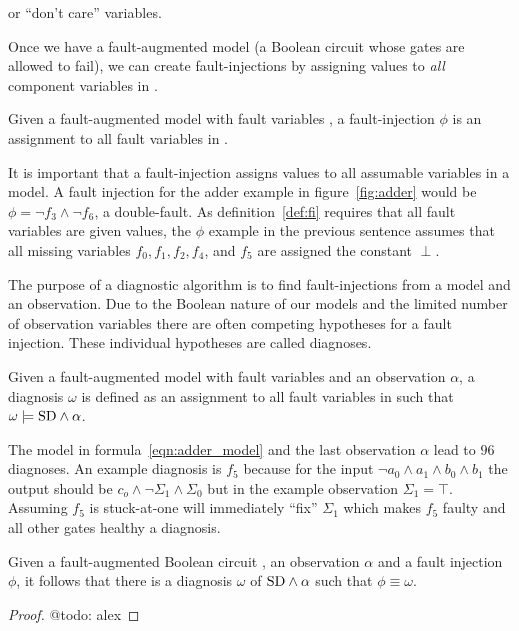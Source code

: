 \documentclass{article}
\begin{document}
or ``don't care'' variables.
\par
Once we have a fault-augmented model (a Boolean circuit whose gates
are allowed to fail), we can create fault-injections by assigning
values to \textit{all} component variables in \comps.
%
\begin{definition}\label{def:fi}
  Given a fault-augmented model \sd with fault variables \comps, a
  fault-injection $\phi$ is an assignment to all fault variables in
  \comps.
\end{definition}
%
It is important that a fault-injection assigns values to all assumable
variables in a model. A fault injection for the adder example in
figure~\ref{fig:adder} would be $\phi = \neg{f_3} \wedge \neg{f_6}$, a
double-fault. As definition~\ref{def:fi} requires that all fault
variables are given values, the $\phi$ example in the previous sentence
assumes that all missing variables $f_0, f_1, f_2, f_4$, and $f_5$ are
assigned the constant $\perp$.
\par
The purpose of a diagnostic algorithm is to find fault-injections from
a model and an observation. Due to the Boolean nature of our models
and the limited number of observation variables there are often
competing hypotheses for a fault injection. These individual
hypotheses are called diagnoses.
%
\begin{definition}[Diagnosis]
  Given a fault-augmented model \sd with fault variables \comps and an
  observation $\alpha$, a diagnosis $\omega$ is defined as an
  assignment to all fault variables in \comps such that $\omega
  \models \mathrm{SD} \wedge \alpha$.
\end{definition}
%
The model in formula~\ref{eqn:adder_model} and the last observation
$\alpha$ lead to $96$ diagnoses. An example diagnosis is $f_5$ because
for the input $\neg{a_0} \wedge a_1 \wedge b_0 \wedge b_1$ the output
should be $c_o \wedge \neg{\Sigma_1} \wedge \Sigma_0$ but in the
example observation $\Sigma_1 = \top$. Assuming $f_5$ is stuck-at-one
will immediately ``fix'' $\Sigma_1$ which makes $f_5$ faulty and all
other gates healthy a diagnosis.
%
\begin{proposition}
  Given a fault-augmented Boolean circuit \sd, an observation $\alpha$
  and a fault injection $\phi$, it follows that there is a diagnosis
  $\omega$ of $\mathrm{SD} \wedge \alpha$ such that $\phi \equiv \omega$.
\end{proposition}
\begin{proof}
  @todo: alex
\end{proof}
\end{document}
